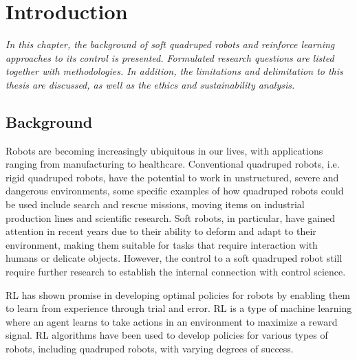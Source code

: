 \chapter{Introduction}
\textit{In this chapter, the background of soft quadruped robots and reinforce learning approaches to its control is presented. Formulated research questions are listed together with methodologies. In addition, the limitations and delimitation to this thesis are discussed, as well as the ethics and sustainability analysis.}

\section{Background}
Robots are becoming increasingly ubiquitous in our lives, with applications ranging from manufacturing to healthcare\cite{wangCurrentResearchesFuture2018}. Conventional quadruped robots, i.e. rigid quadruped robots, have the potential to work in unstructured, severe and dangerous environments\cite{mengReviewQuadrupedRobots2016}, some specific examples of how quadruped robots could be used include search and rescue missions\cite{hawkesSoftRobotThat2017}, moving items on industrial production lines\cite{gehringANYmalFieldSolving2021} and scientific research\cite{hewingLearningbasedModelPredictive2020}. Soft robots, in particular, have gained attention in recent years due to their ability to deform and adapt to their environment, making them suitable for tasks that require interaction with humans or delicate objects\cite{muralidharanSoftQuadrupedRobot2021}. However, the control to a soft quadruped robot still require further research to establish the internal connection with control science\cite{wangControlStrategiesSoft2022}.

\ac{RL} has shown promise in developing optimal policies for robots by enabling them to learn from experience through trial and error. \ac{RL} is a type of machine learning where an agent learns to take actions in an environment to maximize a reward signal. \ac{RL} algorithms have been used to develop policies for various types of robots, including quadruped robots, with varying degrees of success.

